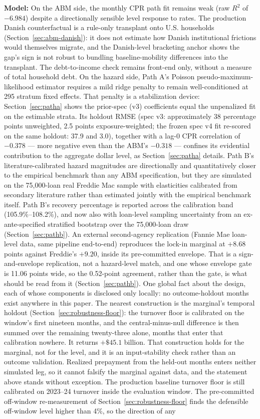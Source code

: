 \documentclass[12pt]{article}
\begin{document}
\textbf{Model:} On the ABM side, the monthly CPR path fit remains weak (raw $R^2$ of $-6.984$) despite a directionally sensible level response to rates. The production Danish counterfactual is a rule-only transplant onto U.S. households (Section~\ref{sec:abm-danish}): it does not estimate how Danish institutional frictions would themselves migrate, and the Danish-level bracketing anchor shows the gap's sign is not robust to bundling baseline-mobility differences into the transplant. The debt-to-income check remains front-end only, without a measure of total household debt. On the hazard side, Path A's Poisson pseudo-maximum-likelihood estimator requires a mild ridge penalty to remain well-conditioned at 295 stratum fixed effects. That penalty is a stabilization device: Section~\ref{sec:patha} shows the prior-spec (v3) coefficients equal the unpenalized fit on the estimable strata. Its holdout RMSE (spec v3: approximately 38 percentage points unweighted, 2.5 points exposure-weighted; the frozen spec v4 fit re-scored on the same holdout: 37.9 and 3.0), together with a lag-0 CPR correlation of $-0.378$ --- more negative even than the ABM's $-0.318$ --- confines its evidential contribution to the aggregate dollar level, as Section~\ref{sec:patha} details. Path B's literature-calibrated hazard magnitudes are directionally and quantitatively closer to the empirical benchmark than any ABM specification, but they are simulated on the 75,000-loan real Freddie Mac sample with elasticities calibrated from secondary literature rather than estimated jointly with the empirical benchmark itself. Path B's recovery percentage is reported across the calibration band (105.9\%--108.2\%), and now also with loan-level sampling uncertainty from an ex-ante-specified stratified bootstrap over the 75,000-loan draw (Section~\ref{sec:pathb}). An external second-agency replication (Fannie Mae loan-level data, same pipeline end-to-end) reproduces the lock-in marginal at $+8.68$ points against Freddie's $+9.20$, inside its pre-committed envelope. That is a sign-and-envelope replication, not a hazard-level match, and one whose envelope gate is 11.06 points wide, so the 0.52-point agreement, rather than the gate, is what should be read from it (Section~\ref{sec:pathb}). One global fact about the design, each of whose components is disclosed only locally: no outcome-holdout months exist anywhere in this paper. The nearest construction is the marginal's temporal holdout (Section~\ref{sec:robustness-floor}): the turnover floor is calibrated on the window's first nineteen months, and the central-minus-null difference is then summed over the remaining twenty-three alone, months that enter that calibration nowhere. It returns $+\$45.1$ billion. That construction holds for the marginal, not for the level, and it is an input-stability check rather than an outcome validation. Realized prepayment from the held-out months enters neither simulated leg, so it cannot falsify the marginal against data, and the statement above stands without exception. The production baseline turnover floor is still calibrated on 2023--24 turnover inside the evaluation window. The pre-committed off-window re-measurement of Section~\ref{sec:robustness-floor} finds the defensible off-window level higher than 4\%, so the direction of any 
\end{document}
